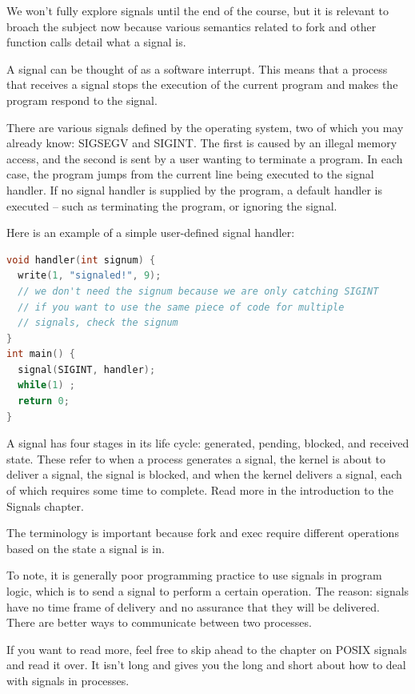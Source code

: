 We won't fully explore signals until the end of the course, but it is relevant to broach the subject now because various semantics related to fork and other function calls detail what a signal is.

A signal can be thought of as a software interrupt. This means that a process that receives a signal stops the execution of the current program and makes the program respond to the signal.

There are various signals defined by the operating system, two of which you may already know: SIGSEGV and SIGINT.
The first is caused by an illegal memory access, and the second is sent by a user wanting to terminate a program.
In each case, the program jumps from the current line being executed to the signal handler.
If no signal handler is supplied by the program, a default handler is executed -- such as terminating the program, or ignoring the signal.

Here is an example of a simple user-defined signal handler:

\begin{lstlisting}[language=C]
void handler(int signum) {
  write(1, "signaled!", 9);
  // we don't need the signum because we are only catching SIGINT
  // if you want to use the same piece of code for multiple
  // signals, check the signum
}
int main() {
  signal(SIGINT, handler);
  while(1) ;
  return 0;
}
\end{lstlisting}

A signal has four stages in its life cycle: generated, pending, blocked, and received state.
These refer to when a process generates a signal, the kernel is about to deliver a signal, the signal is blocked, and when the kernel delivers a signal, each of which requires some time to complete.
Read more in the introduction to the Signals chapter.

The terminology is important because fork and exec require different operations based on the state a signal is in.

To note, it is generally poor programming practice to use signals in program logic, which is to send a signal to perform a certain operation.
The reason: signals have no time frame of delivery and no assurance that they will be delivered.
There are better ways to communicate between two processes.

If you want to read more, feel free to skip ahead to the chapter on POSIX signals and read it over. It isn't long and gives you the long and short about how to deal with signals in processes.

